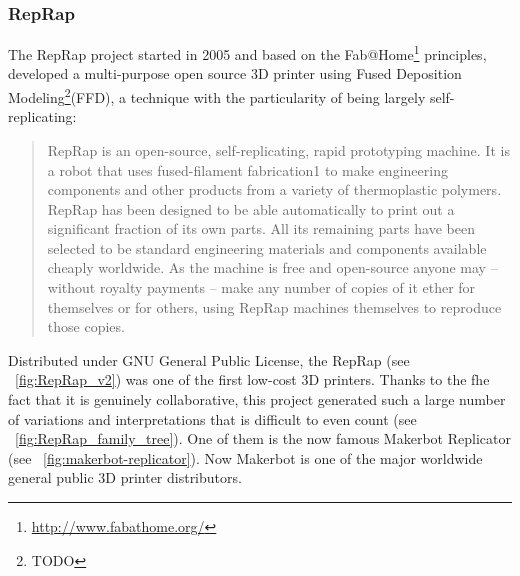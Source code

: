 \subsubsection{RepRap} %

The RepRap project started in 2005 and based on the Fab@Home\footnote{\url{http://www.fabathome.org/}} principles, developed a multi-purpose open source 3D printer using Fused Deposition Modeling\footnote{TODO}(FFD), a technique with the particularity of being largely self-replicating:

\begin{quotation}
    RepRap is an open-source, self-replicating, rapid prototyping machine. It is a robot that uses fused-filament fabrication1 to make engineering components and other products from a variety of thermoplastic polymers. RepRap has been designed to be able automatically to print out a significant fraction of its own parts. All its remaining parts have been selected to be standard engineering materials and components available cheaply worldwide. As the machine is free and open-source anyone may – without royalty payments – make any number of copies of it ether for themselves or for others, using RepRap machines themselves to reproduce those copies.

\end{quotation}


\begin{figure}[]
\centering
    \hfil
    \caption{}
    \label{fig:RepRap_project}
\end{figure}


Distributed under GNU General Public License, the RepRap (see \figurename~\ref{fig:RepRap_v2}) was one of the first low-cost 3D printers. Thanks to the fhe fact that it is genuinely collaborative, this project generated such a large number of variations and interpretations that is difficult to even count (see \figurename~\ref{fig:RepRap_family_tree}). One of them is the now famous Makerbot Replicator (see \figurename~\ref{fig:makerbot-replicator}). Now Makerbot is one of the major worldwide general public 3D printer distributors.

